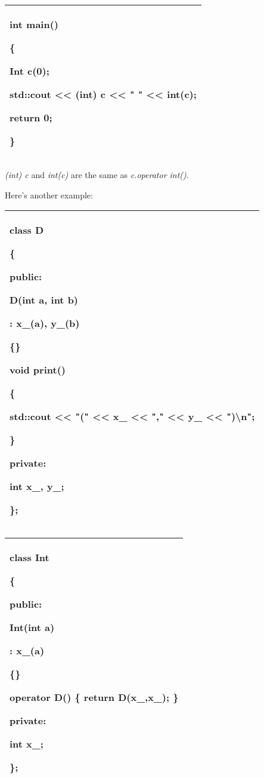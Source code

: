 \documentclass[
]{article}
\begin{document}
\begin{longtable}[]{@{}l@{}}
\toprule
\endhead
\begin{minipage}[t]{0.97\columnwidth}\raggedright
int main()

\{

Int c(0);

std::cout \textless\textless{} \textbf{(int) c} \textless\textless{} " "
\textless\textless{} \textbf{int(c)};

return 0;

\}\strut
\end{minipage}\tabularnewline
\bottomrule
\end{longtable}

\emph{(int) c} and \emph{int(c)} are the same as \emph{c.operator
int()}.

Here's another example:

\begin{longtable}[]{@{}l@{}}
\toprule
\endhead
\begin{minipage}[t]{0.97\columnwidth}\raggedright
class D

\{

public:

D(int a, int b)

: x\_(a), y\_(b)

\{\}

void print()

\{

std::cout \textless\textless{} "(" \textless\textless{} x\_
\textless\textless{} "," \textless\textless{} y\_ \textless\textless{}
")\textbackslash n";

\}

private:

int x\_, y\_;

\};\strut
\end{minipage}\tabularnewline
\bottomrule
\end{longtable}

\begin{longtable}[]{@{}l@{}}
\toprule
\endhead
\begin{minipage}[t]{0.97\columnwidth}\raggedright
class Int

\{

public:

Int(int a)

: x\_(a)

\{\}

operator D() \{ return D(x\_,x\_); \}

private:

int x\_;

\};\strut
\end{minipage}\tabularnewline
\bottomrule
\end{longtable}
\end{document}

